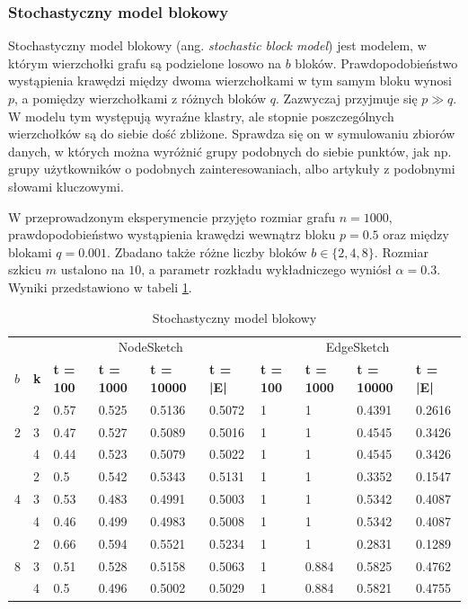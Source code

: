     \subsubsection{Stochastyczny model blokowy}
    Stochastyczny model blokowy (ang. \emph{stochastic block model}) jest modelem, w którym wierzchołki grafu są podzielone losowo na $b$ bloków. Prawdopodobieństwo wystąpienia krawędzi między dwoma wierzchołkami w tym samym bloku wynosi $p$, a pomiędzy wierzchołkami z różnych bloków $q$. Zazwyczaj przyjmuje się $p \gg q$. W modelu tym występują wyraźne klastry, ale stopnie poszczególnych wierzchołków są do siebie dość zbliżone. Sprawdza się on w symulowaniu zbiorów danych, w których można wyróżnić grupy podobnych do siebie punktów, jak np. grupy użytkowników o podobnych zainteresowaniach, albo artykuły z podobnymi słowami kluczowymi. 

    W przeprowadzonym eksperymencie przyjęto rozmiar grafu $n = 1000$, prawdopodobieństwo wystąpienia krawędzi wewnątrz bloku $p = 0.5$ oraz między blokami $q = 0.001$. Zbadano także różne liczby bloków $b \in \{2,4,8\}$. Rozmiar szkicu $m$ ustalono na $10$, a parametr rozkładu wykładniczego wyniósł $\alpha = 0.3$. Wyniki przedstawiono w tabeli \ref{tab:stochastic_block_model}.

    \begin{table}[!ht]
        \small
        \centering
        \begin{tabular}{|l|l|l|l|l|l|l|l|l|l|}
        \hline
            & & \multicolumn{4}{c|}{NodeSketch} & \multicolumn{4}{c|}{EdgeSketch} \\ \cline{1-10}
            \textbf{$b$} & \textbf{k} & \textbf{t = 100} & \textbf{t = 1000} & \textbf{t = 10000} & \textbf{t = |E|} & \textbf{t = 100} & \textbf{t = 1000} & \textbf{t = 10000} & \textbf{t = |E|} \\ \hline\hline
            \multirow{3}{*}{2} & 2 & 0.57 & 0.525 & 0.5136 & 0.5072 & 1 & 1 & 0.4391 & 0.2616 \\ \cline{2-10}
             & 3 & 0.47 & 0.527 & 0.5089 & 0.5016 & 1 & 1 & 0.4545 & 0.3426 \\ \cline{2-10}
             & 4 & 0.44 & 0.523 & 0.5079 & 0.5022 & 1 & 1 & 0.4545 & 0.3426 \\ \hline\hline
            \multirow{3}{*}{4} & 2 & 0.5 & 0.542 & 0.5343 & 0.5131 & 1 & 1 & 0.3352 & 0.1547 \\ \cline{2-10}
             & 3 & 0.53 & 0.483 & 0.4991 & 0.5003 & 1 & 1 & 0.5342 & 0.4087 \\ \cline{2-10}
             & 4 & 0.46 & 0.499 & 0.4983 & 0.5008 & 1 & 1 & 0.5342 & 0.4087 \\ \hline\hline
            \multirow{3}{*}{8} & 2 & 0.66 & 0.594 & 0.5521 & 0.5234 & 1 & 1 & 0.2831 & 0.1289 \\ \cline{2-10}
             & 3 & 0.51 & 0.528 & 0.5158 & 0.5063 & 1 & 0.884 & 0.5825 & 0.4762 \\ \cline{2-10}
             & 4 & 0.5 & 0.496 & 0.5002 & 0.5029 & 1 & 0.884 & 0.5821 & 0.4755 \\ \hline
        \end{tabular}
        \caption{Stochastyczny model blokowy}
        \label{tab:stochastic_block_model}
    \end{table}

